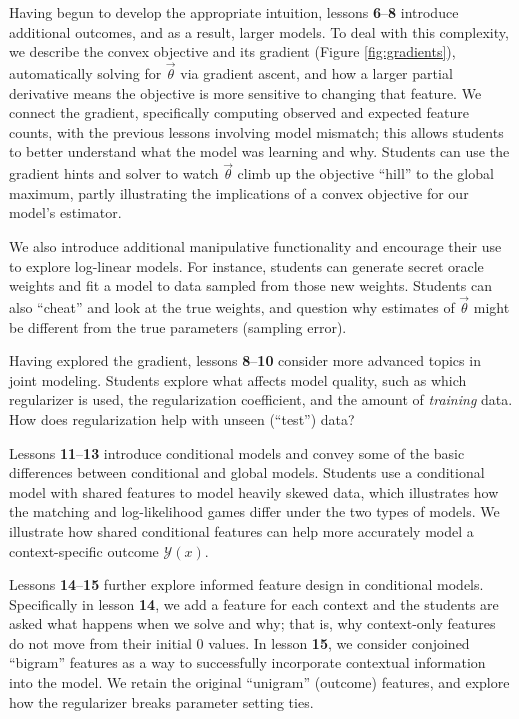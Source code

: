 \documentclass[11pt,letterpaper]{article}
\begin{document}
Having begun to develop the appropriate intuition, lessons \textbf{6}--\textbf{8} introduce 
additional outcomes, and as a result, larger models. To deal with this complexity, we describe the convex 
objective and its gradient 
(Figure \ref{fig:gradients}), 
automatically solving for $\vec{\theta}$ via gradient ascent, and how a larger partial derivative means the objective is more 
sensitive to changing that feature. We connect the gradient, specifically computing observed and expected feature 
counts, with the previous lessons involving model mismatch; this allows students to better understand what the 
model was learning and why. 
Students can use the gradient hints and solver to watch $\vec{\theta}$ climb up the objective ``hill'' to the global maximum, 
partly illustrating the implications of a convex objective for our model's estimator.

We also introduce additional manipulative functionality and encourage their use to 
explore log-linear models. For instance, students can generate secret oracle weights and 
fit a model to data sampled from those new weights. Students can also ``cheat'' and look at the true 
weights,  and question why estimates of $\vec{\theta}$ might be different from the true parameters 
(sampling error).

Having explored the gradient, lessons \textbf{8}--\textbf{10} consider more advanced topics in joint 
modeling. Students explore what affects model quality, such as which regularizer is used, the 
regularization coefficient, and the amount of \textit{training} data. How does regularization help with 
unseen (``test'') data? 

Lessons \textbf{11}--\textbf{13} introduce conditional models and convey some of the basic differences between 
conditional and global models. Students use a conditional model with shared features to model 
heavily skewed data, which illustrates how the matching and log-likelihood games differ under the two types of 
models. We illustrate how shared conditional features can help more accurately model a context-specific 
outcome $\mathcal{Y}(x)$.

Lessons \textbf{14}--\textbf{15} further explore informed feature design in conditional models. 
Specifically in lesson \textbf{14}, we add a feature for each context and the students are asked what happens 
when we solve and why; that is, why context-only features do not move from their initial 0 values. 
In lesson \textbf{15}, we consider conjoined ``bigram'' features as a way to successfully incorporate 
contextual information into the model. We retain the original ``unigram'' (outcome) features, and explore
how the regularizer breaks parameter setting ties.
\end{document}
